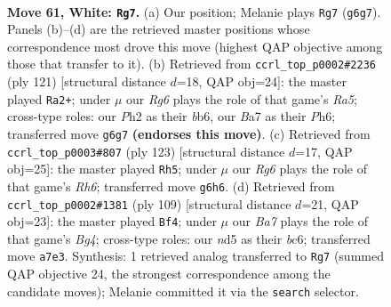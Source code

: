 \documentclass[11pt]{article}
\begin{document}
\clearpage

\begin{figure}[p]\centering
\begin{subfigure}{0.46\textwidth}\centering
\resizebox{\linewidth}{!}{%
\newchessgame
\chessboard[
  setfen={2k5/B1p5/6R1/3n1p2/B4P2/8/3K3P/8 w - - 3 61},
  showmover=false,
  pgfstyle=straightmove, color=movearrow, markmove={g6-g7}
]}
\caption{}
\end{subfigure}\hfill
\begin{subfigure}{0.46\textwidth}\centering
\resizebox{\linewidth}{!}{%
\newchessgame
\chessboard[
  setfen={8/5k2/1B3p1p/5p1N/r7/6P1/6K1/8 b - - 26 61},
  showmover=false,
  pgfstyle=straightmove, color=movearrow, markmove={a4-a2}
]}
\caption{}
\end{subfigure}
\\[4pt]
\begin{subfigure}{0.46\textwidth}\centering
\resizebox{\linewidth}{!}{%
\newchessgame
\chessboard[
  setfen={8/2k5/8/p7/P1N5/7r/1PK5/8 b - - 2 62},
  showmover=false,
  pgfstyle=straightmove, color=movearrow, markmove={h3-h5}
]}
\caption{}
\end{subfigure}\hfill
\begin{subfigure}{0.46\textwidth}\centering
\resizebox{\linewidth}{!}{%
\newchessgame
\chessboard[
  setfen={8/p7/2B5/4k1b1/p7/5P2/P4K2/8 b - - 11 55},
  showmover=false,
  pgfstyle=straightmove, color=movearrow, markmove={g5-f4}
]}
\caption{}
\end{subfigure}
\caption{\textbf{Move 61, White: \texttt{Rg7}.} (a) Our position; Melanie plays \texttt{Rg7} (\texttt{g6g7}). Panels (b)--(d) are the retrieved master positions whose correspondence most drove this move (highest QAP objective among those that transfer to it). (b) Retrieved from \texttt{ccrl\_top\_p0002\#2236} (ply 121) [structural distance $d$=18, QAP obj=24]: the master played \texttt{Ra2+}; under $\mu$ our \emph{Rg6} plays the role of that game's \emph{Ra5}; cross-type roles: our \emph{P}h2 as their \emph{b}b6, our \emph{B}a7 as their \emph{P}h6; transferred move \texttt{g6g7} \textbf{(endorses this move)}. (c) Retrieved from \texttt{ccrl\_top\_p0003\#807} (ply 123) [structural distance $d$=17, QAP obj=25]: the master played \texttt{Rh5}; under $\mu$ our \emph{Rg6} plays the role of that game's \emph{Rh6}; transferred move \texttt{g6h6}. (d) Retrieved from \texttt{ccrl\_top\_p0002\#1381} (ply 109) [structural distance $d$=21, QAP obj=23]: the master played \texttt{Bf4}; under $\mu$ our \emph{Ba7} plays the role of that game's \emph{Bg4}; cross-type roles: our \emph{n}d5 as their \emph{b}c6; transferred move \texttt{a7e3}. Synthesis: 1 retrieved analog transferred to \texttt{Rg7} (summed QAP objective 24, the strongest correspondence among the candidate moves); Melanie committed it via the \texttt{search} selector.}
\label{fig:thought-m120}
\end{figure}
\end{document}

